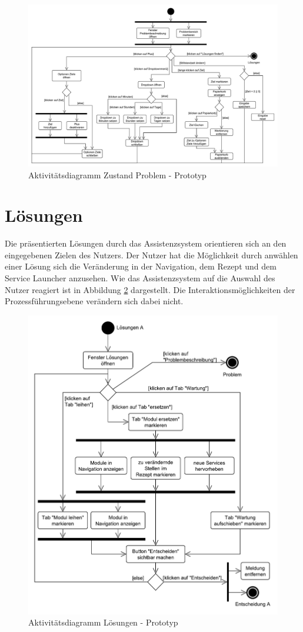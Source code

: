 \begin{figure}[tbp]
\centering
\includegraphics[angle=90,scale=0.5]{DA_files/UML/Prototyp/Aktivitaetsdiagramm-Problem.pdf}
\caption{Aktivitätsdiagramm Zustand Problem - Prototyp}
\label{pic:Aktivitaetsdiagramm-Problem}
\end{figure}

\section{Lösungen}
\label{5:Loesungen}
Die präsentierten Lösungen durch das Assistenzsystem orientieren sich an den eingegebenen Zielen des Nutzers. Der Nutzer hat die Möglichkeit durch anwählen einer Lösung sich die Veränderung in der Navigation, dem Rezept und dem Service Launcher anzusehen. Wie das Assistenzsystem auf die Auswahl des Nutzer reagiert ist in Abbildung \ref{pic:Aktivitaetsdiagramm-Loesungen} dargestellt. Die Interaktionsmöglichkeiten der Prozessführungsebene verändern sich dabei nicht.

\begin{figure}[htbp]
\centering
\includegraphics[scale=0.6]{DA_files/UML/Prototyp/Aktivitaetsdiagramm-Loesungen.pdf}
\caption{Aktivitätsdiagramm Lösungen - Prototyp}
\label{pic:Aktivitaetsdiagramm-Loesungen}
\end{figure}
